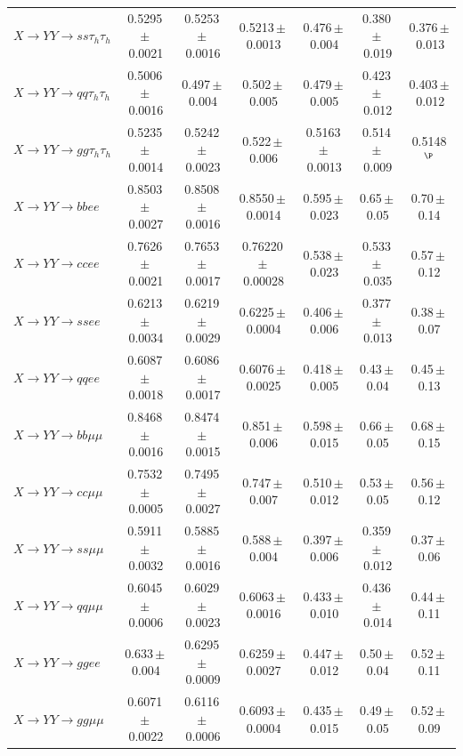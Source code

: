 \begin{landscape}
{\begin{longtable}{@{\extracolsep{\fill}}lcccccc@{}}
$X\to YY\to ss\tau_h\tau_h$ & 0.5295\,$\pm$\,0.0021 & 0.5253\,$\pm$\,0.0016 & 0.5213\,$\pm$\,0.0013 & 0.476\,$\pm$\,0.004 & 0.380\,$\pm$\,0.019 & 0.376\,$\pm$\,0.013 \\
$X\to YY\to qq\tau_h\tau_h$ & 0.5006\,$\pm$\,0.0016 & 0.497\,$\pm$\,0.004 & 0.502\,$\pm$\,0.005 & 0.479\,$\pm$\,0.005 & 0.423\,$\pm$\,0.012 & 0.403\,$\pm$\,0.012 \\
$X\to YY\to gg\tau_h\tau_h$ & 0.5235\,$\pm$\,0.0014 & 0.5242\,$\pm$\,0.0023 & 0.522\,$\pm$\,0.006 & 0.5163\,$\pm$\,0.0013 & 0.514\,$\pm$\,0.009 & 0.5148$^{\P}$ \\
\midrule
$X\to YY\to bbee$ & 0.8503\,$\pm$\,0.0027 & 0.8508\,$\pm$\,0.0016 & 0.8550\,$\pm$\,0.0014 & 0.595\,$\pm$\,0.023 & 0.65\,$\pm$\,0.05 & 0.70\,$\pm$\,0.14 \\
$X\to YY\to ccee$ & 0.7626\,$\pm$\,0.0021 & 0.7653\,$\pm$\,0.0017 & 0.76220\,$\pm$\,0.00028 & 0.538\,$\pm$\,0.023 & 0.533\,$\pm$\,0.035 & 0.57\,$\pm$\,0.12 \\
$X\to YY\to ssee$ & 0.6213\,$\pm$\,0.0034 & 0.6219\,$\pm$\,0.0029 & 0.6225\,$\pm$\,0.0004 & 0.406\,$\pm$\,0.006 & 0.377\,$\pm$\,0.013 & 0.38\,$\pm$\,0.07 \\
$X\to YY\to qqee$ & 0.6087\,$\pm$\,0.0018 & 0.6086\,$\pm$\,0.0017 & 0.6076\,$\pm$\,0.0025 & 0.418\,$\pm$\,0.005 & 0.43\,$\pm$\,0.04 & 0.45\,$\pm$\,0.13 \\
$X\to YY\to bb\mu\mu$ & 0.8468\,$\pm$\,0.0016 & 0.8474\,$\pm$\,0.0015 & 0.851\,$\pm$\,0.006 & 0.598\,$\pm$\,0.015 & 0.66\,$\pm$\,0.05 & 0.68\,$\pm$\,0.15 \\
$X\to YY\to cc\mu\mu$ & 0.7532\,$\pm$\,0.0005 & 0.7495\,$\pm$\,0.0027 & 0.747\,$\pm$\,0.007 & 0.510\,$\pm$\,0.012 & 0.53\,$\pm$\,0.05 & 0.56\,$\pm$\,0.12 \\
$X\to YY\to ss\mu\mu$ & 0.5911\,$\pm$\,0.0032 & 0.5885\,$\pm$\,0.0016 & 0.588\,$\pm$\,0.004 & 0.397\,$\pm$\,0.006 & 0.359\,$\pm$\,0.012 & 0.37\,$\pm$\,0.06 \\
$X\to YY\to qq\mu\mu$ & 0.6045\,$\pm$\,0.0006 & 0.6029\,$\pm$\,0.0023 & 0.6063\,$\pm$\,0.0016 & 0.433\,$\pm$\,0.010 & 0.436\,$\pm$\,0.014 & 0.44\,$\pm$\,0.11 \\
$X\to YY\to ggee$ & 0.633\,$\pm$\,0.004 & 0.6295\,$\pm$\,0.0009 & 0.6259\,$\pm$\,0.0027 & 0.447\,$\pm$\,0.012 & 0.50\,$\pm$\,0.04 & 0.52\,$\pm$\,0.11 \\
$X\to YY\to gg\mu\mu$ & 0.6071\,$\pm$\,0.0022 & 0.6116\,$\pm$\,0.0006 & 0.6093\,$\pm$\,0.0004 & 0.435\,$\pm$\,0.015 & 0.49\,$\pm$\,0.05 & 0.52\,$\pm$\,0.09 \\
\midrule

\end{longtable}}
\end{landscape}
